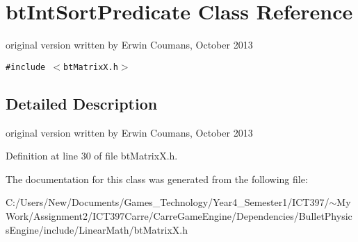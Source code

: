 \hypertarget{classbt_int_sort_predicate}{
\section{btIntSortPredicate Class Reference}
\label{classbt_int_sort_predicate}
}
original version written by Erwin Coumans, October 2013  


{\tt \#include $<$btMatrixX.h$>$}



\subsection{Detailed Description}
original version written by Erwin Coumans, October 2013 

Definition at line 30 of file btMatrixX.h.

The documentation for this class was generated from the following file:\begin{CompactItemize}
\item 
C:/Users/New/Documents/Games\_\-Technology/Year4\_\-Semester1/ICT397/$\sim$My Work/Assignment2/ICT397Carre/CarreGameEngine/Dependencies/BulletPhysicsEngine/include/LinearMath/btMatrixX.h\end{CompactItemize}
